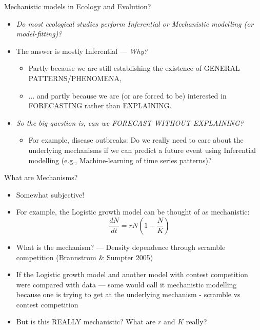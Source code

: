 \documentclass[xcolor=x11names,compress]{beamer}
\renewcommand{\(}{\begin{columns}}
\renewcommand{\)}{\end{columns}}
\newcommand{\<}[1]{\begin{column}{#1}}
\renewcommand{\>}{\end{column}}
\begin{document}
\begin{frame}{Mechanistic models in Ecology and Evolution?}

\begin{itemize}[<+->] \itemsep12pt
	\item \it Do most ecological studies perform Inferential or Mechanistic modelling (or model-fitting)?
	
	\item The answer is mostly Inferential \pause --- {\it Why?} \pause
	\begin{itemize}
		\item Partly because we are still establishing the existence of GENERAL PATTERNS/PHENOMENA,
		\item  ... and partly because we are (or are forced to be) interested in FORECASTING rather than EXPLAINING. 
 
	\end{itemize}	  
	
	\item {\it So the big question is, can we FORECAST WITHOUT EXPLAINING?}
	
	\begin{itemize}
		\item For example, disease outbreaks: Do we really need to care about the underlying mechanisms if we can predict a future event using Inferential modelling (e.g., Machine-learning of time series patterns)?
		
	\end{itemize}

\end{itemize}

\end{frame}

\begin{frame}{What are Mechanisms?}

   \begin{itemize}[<+->] \itemsep10pt
		\item Somewhat subjective! 
		\item For example, the Logistic growth model can be thought of as mechanistic:
		$$ 
			\dfrac{dN}{dt} = r N \left(1-\frac{N}{K}\right)  
		$$ 
				
		\item What is the mechanism? \pause --- Density dependence through scramble competition (Brannstrom \& Sumpter 2005)

		\item If the Logistic growth model and another model with contest
			competition were compared with data --- some would call it
			mechanistic  modelling because one is trying to get at the
			underlying mechanism - scramble vs contest competition
			
		\item But is this REALLY mechanistic? What are $r$ and $K$ really?
   \end{itemize}

\end{frame}
\end{document}
